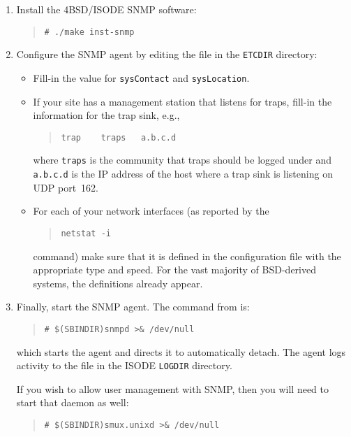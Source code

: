 \begin{enumerate}
\item	Install the 4BSD/ISODE SNMP software:
\begin{quote}\small\begin{verbatim}
# ./make inst-snmp
\end{verbatim}\end{quote}

\item	Configure the SNMP agent by editing the file  in the
\verb"ETCDIR" directory:
    \begin{itemize}
    \item	Fill-in the value for \verb"sysContact" and \verb"sysLocation".

    \item	If your site has a management station that listens for traps,
		fill-in the information for the trap sink, e.g.,
\begin{quote}\small	\begin{verbatim}
trap    traps   a.b.c.d
\end{verbatim}\end{quote}
	where \verb"traps" is the community that traps should be logged under
	and \verb"a.b.c.d" is the IP address of the host where a trap sink is
	listening on UDP port~162.

    \item	For each of your network interfaces
		(as reported by the
\begin{quote}\small\begin{verbatim}
netstat -i
\end{verbatim}\end{quote}
		command)
		make sure that it is defined in the configuration file with
		the appropriate type and speed.
		For the vast majority of BSD-derived systems,
		the definitions already appear.
    \end{itemize}

\item	Finally, start the SNMP agent.
The command from  is:
\begin{quote}\small\begin{verbatim}
# $(SBINDIR)snmpd >& /dev/null
\end{verbatim}\end{quote}
which starts the agent and directs it to automatically detach.
The agent logs activity to the file  in the ISODE
\verb"LOGDIR" directory.

If you wish to allow user management with SNMP,
then you will need to start that daemon as well:
\begin{quote}\small\begin{verbatim}
# $(SBINDIR)smux.unixd >& /dev/null
\end{verbatim}\end{quote}


\end{enumerate}
